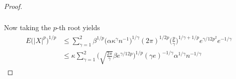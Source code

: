 \documentclass[10pt,a4paper]{amsart}
\begin{document}
\begin{proof}
\begin{align}
\begin{split}
\end{split}
\end{align}
Now taking the \(p\)-th root yields
\begin{align}
\begin{split}
    E\big(\vert X \vert^p\big)^{1/p} & \leq \sum_{\gamma=1}^2 \beta^{1/p}  \big(\alpha \kappa^\gamma n^{-1}\big)^{1/{\gamma}} (2 \pi)^{1/2p} \Big(\frac{p}{\gamma}\Big)^{1/{\gamma}+ 1/{p}} e^{\gamma/12p^2} e^{-1/{\gamma}} \\
    & \leq \kappa \sum_{\gamma=1}^2 \Big( \sqrt{\frac{2\pi}{\gamma}} \beta  e^{\gamma/12p} \Big)^{1/p} (\gamma e)^{-1/{\gamma}} \alpha^{1/\gamma} n^{-1/\gamma} 
\end{split}
\end{align}
\end{proof}   
\end{document}
